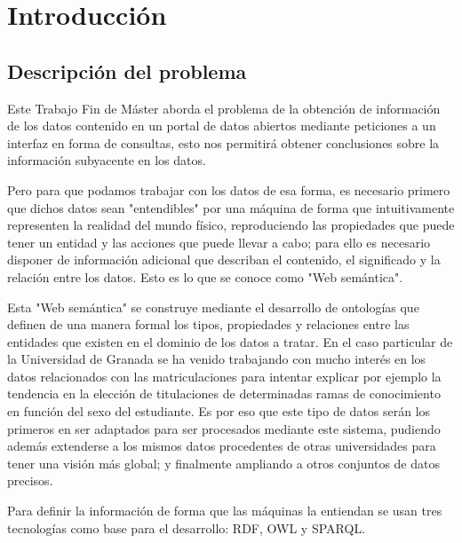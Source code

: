 \chapter{Introducción}

\section{Descripción del problema}

Este Trabajo Fin de Máster aborda el problema de la obtención de información de los datos contenido en un portal de datos abiertos mediante peticiones a un interfaz en forma de consultas, esto nos permitirá obtener conclusiones sobre la información subyacente en los datos.

\bigskip
Pero para que podamos trabajar con los datos de esa forma, es necesario primero que dichos datos sean "entendibles" por una máquina de forma que intuitivamente representen la realidad del mundo físico, reproduciendo las propiedades que puede tener un entidad y las acciones que puede llevar a cabo; para ello es necesario disponer de información adicional que describan el contenido, el significado y la relación entre los datos. Esto es lo que se conoce como "Web semántica".

\bigskip
Esta "Web semántica" se construye mediante el desarrollo de ontologías que definen de una manera formal los tipos, propiedades y relaciones entre las entidades que existen en el dominio de los datos a tratar. En el caso particular de la Universidad de Granada se ha venido trabajando con mucho interés en los datos relacionados con las matriculaciones para intentar explicar por ejemplo la tendencia en la elección de titulaciones de determinadas ramas de conocimiento en función del sexo del estudiante. Es por eso que este tipo de datos serán los primeros en ser adaptados para ser procesados mediante este sistema, pudiendo además extenderse a los mismos datos procedentes de otras universidades para tener una visión más global; y finalmente ampliando a otros conjuntos de datos precisos. 

\newpage
Para definir la información de forma que las máquinas la entiendan se usan tres tecnologías como base para el desarrollo: RDF, OWL y SPARQL.

